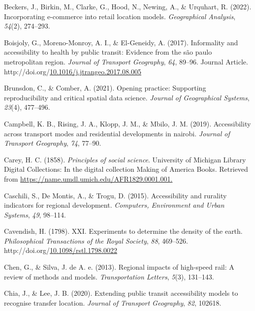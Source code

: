 \documentclass[
11pt, %
oneside, %
english, %
singlespacing, %
]{macthesis} %
\newlength{\cslhangindent}
\newenvironment{CSLReferences}[2] %
{\begin{list}{}{%
	\setlength{\itemindent}{0pt}
	\setlength{\leftmargin}{0pt}
	\setlength{\parsep}{0pt}
	\ifodd #1
	\setlength{\leftmargin}{\cslhangindent}
	\setlength{\itemindent}{-1\cslhangindent}
	\fi
	\setlength{\itemsep}{#2\baselineskip}}}
{\end{list}}
\begin{document}
\begin{CSLReferences}{1}{0}
Beckers, J., Birkin, M., Clarke, G., Hood, N., Newing, A., \& Urquhart, R. (2022). Incorporating e-commerce into retail location models. \emph{Geographical Analysis}, \emph{54}(2), 274--293.

Boisjoly, G., Moreno-Monroy, A. I., \& El-Geneidy, A. (2017). Informality and accessibility to health by public transit: Evidence from the são paulo metropolitan region. \emph{Journal of Transport Geography}, \emph{64}, 89--96. Journal Article. http://doi.org/\href{https://doi.org/10.1016/j.jtrangeo.2017.08.005}{10.1016/j.jtrangeo.2017.08.005}

Brunsdon, C., \& Comber, A. (2021). Opening practice: Supporting reproducibility and critical spatial data science. \emph{Journal of Geographical Systems}, \emph{23}(4), 477--496.

Campbell, K. B., Rising, J. A., Klopp, J. M., \& Mbilo, J. M. (2019). Accessibility across transport modes and residential developments in nairobi. \emph{Journal of Transport Geography}, \emph{74}, 77--90.

Carey, H. C. (1858). \emph{Principles of social science}. University of Michigan Library Digital Collections: In the digital collection Making of America Books. Retrieved from \url{https://name.umdl.umich.edu/AFR1829.0001.001.}

Caschili, S., De Montis, A., \& Trogu, D. (2015). Accessibility and rurality indicators for regional development. \emph{Computers, Environment and Urban Systems}, \emph{49}, 98--114.

Cavendish, H. (1798). {XXI}. {Experiments} to determine the density of the earth. \emph{Philosophical Transactions of the Royal Society}, \emph{88}, 469--526. http://doi.org/\href{https://doi.org/10.1098/rstl.1798.0022}{10.1098/rstl.1798.0022}

Chen, G., \& Silva, J. de A. e. (2013). Regional impacts of high-speed rail: A review of methods and models. \emph{Transportation Letters}, \emph{5}(3), 131--143.

Chia, J., \& Lee, J. B. (2020). Extending public transit accessibility models to recognise transfer location. \emph{Journal of Transport Geography}, \emph{82}, 102618.


\end{CSLReferences}
\end{document}
